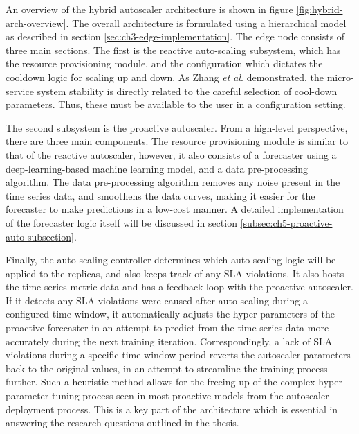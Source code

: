 An overview of the hybrid autoscaler architecture is shown in figure \ref{fig:hybrid-arch-overview}. The overall architecture is formulated using a hierarchical model as described in section \ref{sec:ch3-edge-implementation}. The edge node consists of three main sections. The first is the reactive auto-scaling subsystem, which has the resource provisioning module, and the configuration which dictates the cooldown logic for scaling up and down. As Zhang \textit{et al}. \cite{zhang2019quantifying} demonstrated, the micro-service system stability is directly related to the careful selection of cool-down parameters. Thus, these must be available to the user in a configuration setting.\par

The second subsystem is the proactive autoscaler. From a high-level perspective, there are three main components. The resource provisioning module is similar to that of the reactive autoscaler, however, it also consists of a forecaster using a deep-learning-based machine learning model, and a data pre-processing algorithm. The data pre-processing algorithm removes any noise present in the time series data, and smoothens the data curves, making it easier for the forecaster to make predictions in a low-cost manner. A detailed implementation of the forecaster logic itself will be discussed in section \ref{subsec:ch5-proactive-auto-subsection}.\par

Finally, the auto-scaling controller determines which auto-scaling logic will be applied to the replicas, and also keeps track of any SLA violations. It also hosts the time-series metric data and has a feedback loop with the proactive autoscaler. If it detects any SLA violations were caused after auto-scaling during a configured time window, it automatically adjusts the hyper-parameters of the proactive forecaster in an attempt to predict from the time-series data more accurately during the next training iteration. Correspondingly, a lack of SLA violations during a specific time window period reverts the autoscaler parameters back to the original values, in an attempt to streamline the training process further. Such a heuristic method allows for the freeing up of the complex hyper-parameter tuning process seen in most proactive models from the autoscaler deployment process. This is a key part of the architecture which is essential in answering the research questions outlined in the thesis.\par


